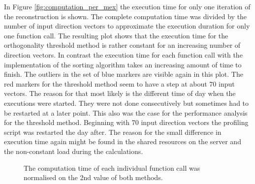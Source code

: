 In Figure \ref{fig:computation_per_mex} the execution time for only one iteration of the reconstruction is shown. The complete computation time was divided by the number of input direction vectors to approximate the execution duration for only one function call. The resulting plot shows that the execution time for the orthogonality threshold method is rather constant for an increasing number of direction vectors. In contrast the execution time for each function call with the implementation of the sorting algorithm takes an increasing amount of time to finish. The outliers in the set of blue markers are visible again in this plot. The red markers for the threshold method seem to have a step at about 70 input vectors. The reason for that most likely is the different time of day when the executions were started. They were not done consecutively but sometimes had to be restarted at a later point. This also was the case for the performance analysis for the threshold method. Beginning with 70 input direction vectors the profiling script was restarted the day after. The reason for the small difference in execution time again might be found in the shared resources on the server and the non-constant load during the calculations. 



\begin{figure}[H]
    \centering
    \caption{The computation time of each individual function call was normalised on the 2nd value of both methods.}
    \label{fig:computation_normlaized_2nd}
\end{figure}

